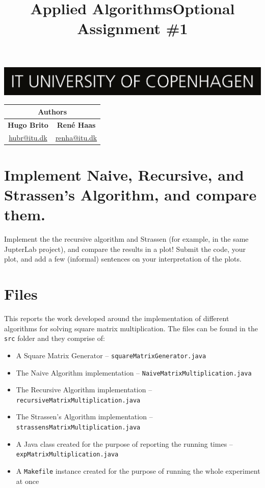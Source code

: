 \documentclass{tufte-handout}
\title{Applied Algorithms\newline Optional Assignment \#1}
\begin{document}
\thispagestyle{empty}

\maketitle

\includegraphics[width=\textwidth]{logo_en.png}

\vspace{5mm}\noindent %

\begin{table}[!h]
\centering
\begin{tabular}{cc}
\multicolumn{2}{c}{Authors}                                   \\ \hline
\multicolumn{1}{c|}{\textbf{Hugo Brito}} & \textbf{René Haas} \\
\multicolumn{1}{c|}{\href{mailto:hubr@itu.dk}{hubr@itu.dk}}         & \href{mailto:renha@itu.dk}{renha@itu.dk}       \\ \hline
\end{tabular}
\end{table}

\vspace{5mm} %

\section{Implement Naive, Recursive, and Strassen's Algorithm, and compare them.}

\noindent Implement the the recursive algorithm and Strassen (for example, in the same JupterLab project), and compare the results in a plot! Submit the code, your plot, and add a few (informal) sentences on your interpretation of the plots.

\section{Files}
This reports the work developed around the implementation of different algorithms for solving square matrix multiplication. The files can be found in the {\tt src} folder and they comprise of:
\begin{itemize}
    \item A Square Matrix Generator -- {\tt squareMatrixGenerator.java}
    \item The Naive Algorithm implementation -- {\tt NaiveMatrixMultiplication.java}
    \item The Recursive Algorithm implementation -- {\tt recursiveMatrixMultiplication.java}
    \item The Strassen's Algorithm implementation -- {\tt strassensMatrixMultiplication.java}
    \item A Java class created for the purpose of reporting the running times -- {\tt expMatrixMultiplication.java}
    \item A {\tt Makefile} instance created for the purpose of running the whole experiment at once
\end{itemize}
\end{document}
